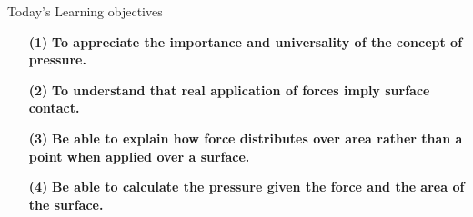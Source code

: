 \documentclass[usenames,dvipsnames]{beamer}
\begin{document}
\begin{frame}{\huge{Today's Learning objectives}}
   \begin{itemize}
   \item[\bf{(1)}] \textbf{To appreciate the importance and universality of the concept of pressure.}
   \item[\bf{(2)}] \textbf{To understand that real application of forces imply surface contact.}
   \item[\bf{(3)}] \textbf{Be able to explain how force distributes over area rather than a point when applied over a surface.}
   \item[\bf{(4)}] \textbf{Be able to calculate the pressure given the force and the area of the surface.}
   
   \end{itemize}
\end{frame}
\end{document}

